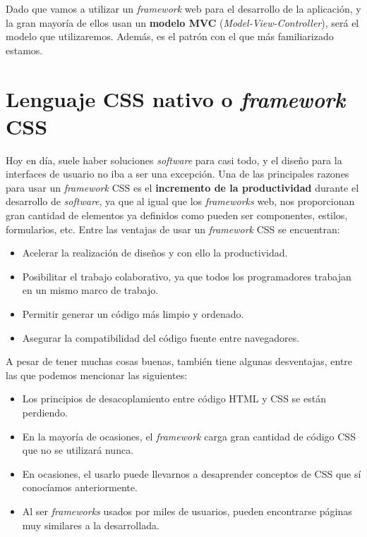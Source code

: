 Dado que vamos a utilizar un \textit{framework} web para el desarrollo de la aplicación, y
la gran mayoría de ellos usan un \textbf{modelo MVC} (\textit{Model-View-Controller}), será
el modelo que utilizaremos. Además, es el patrón con el que más familiarizado estamos.

\section{Lenguaje CSS nativo o \textit{framework} CSS} \label{sec:css-frameworkcss}
Hoy en día, suele haber soluciones \textit{software} para casi todo, y el diseño para la
interfaces de usuario no iba a ser una excepción. Una de las principales razones para usar
un \textit{framework} CSS es el \textbf{incremento de la productividad} durante el desarrollo
de \textit{software}, ya que al igual que los \textit{frameworks} web, nos proporcionan gran
cantidad de elementos ya definidos como pueden ser componentes, estilos, formularios, etc.
Entre las ventajas de usar un \textit{framework} CSS se encuentran:

    \begin{itemize}
        \item Acelerar la realización de diseños y con ello la productividad.
        \item Posibilitar el trabajo colaborativo, ya que todos los programadores
        trabajan en un mismo marco de trabajo.
        \item Permitir generar un código más limpio y ordenado.
        \item Asegurar la compatibilidad del código fuente entre navegadores.
    \end{itemize}

A pesar de tener muchas cosas buenas, también tiene algunas desventajas, entre las que
podemos mencionar las siguientes:

    \begin{itemize}
        \item Los principios de desacoplamiento entre código HTML y CSS se están perdiendo.
        \item En la mayoría de ocasiones, el \textit{framework} carga gran cantidad de
        código CSS que no se utilizará nunca.
        \item En ocasiones, el usarlo puede llevarnos a desaprender conceptos de CSS que sí
        conocíamos anteriormente.
        \item Al ser \textit{frameworks} usados por miles de usuarios, pueden encontrarse
        páginas muy similares a la desarrollada.
    \end{itemize}

